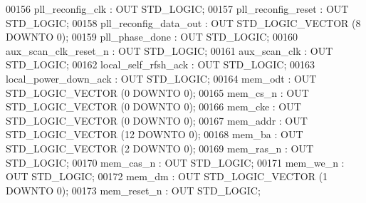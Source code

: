 \begin{DoxyCode}
{00156         pll_reconfig_clk    : \textcolor{keywordflow}{OUT} \textcolor{comment}{STD\_LOGIC};
00157         pll_reconfig_reset  : \textcolor{keywordflow}{OUT} \textcolor{comment}{STD\_LOGIC};
00158         pll_reconfig_data_out   : \textcolor{keywordflow}{OUT} \textcolor{comment}{STD\_LOGIC\_VECTOR} (\textcolor{vhdllogic}{}\textcolor{vhdllogic}{8} \textcolor{keywordflow}{DOWNTO} \textcolor{vhdllogic}{}\textcolor{vhdllogic}{0});
00159         pll_phase_done  : \textcolor{keywordflow}{OUT} \textcolor{comment}{STD\_LOGIC};
00160         aux_scan_clk_reset_n    : \textcolor{keywordflow}{OUT} \textcolor{comment}{STD\_LOGIC};
00161         aux_scan_clk    : \textcolor{keywordflow}{OUT} \textcolor{comment}{STD\_LOGIC};
00162         local_self_rfsh_ack : \textcolor{keywordflow}{OUT} \textcolor{comment}{STD\_LOGIC};
00163         local_power_down_ack    : \textcolor{keywordflow}{OUT} \textcolor{comment}{STD\_LOGIC};
00164         mem_odt : \textcolor{keywordflow}{OUT} \textcolor{comment}{STD\_LOGIC\_VECTOR} (\textcolor{vhdllogic}{}\textcolor{vhdllogic}{0} \textcolor{keywordflow}{DOWNTO} \textcolor{vhdllogic}{}\textcolor{vhdllogic}{0});
00165         mem_cs_n    : \textcolor{keywordflow}{OUT} \textcolor{comment}{STD\_LOGIC\_VECTOR} (\textcolor{vhdllogic}{}\textcolor{vhdllogic}{0} \textcolor{keywordflow}{DOWNTO} \textcolor{vhdllogic}{}\textcolor{vhdllogic}{0});
00166         mem_cke : \textcolor{keywordflow}{OUT} \textcolor{comment}{STD\_LOGIC\_VECTOR} (\textcolor{vhdllogic}{}\textcolor{vhdllogic}{0} \textcolor{keywordflow}{DOWNTO} \textcolor{vhdllogic}{}\textcolor{vhdllogic}{0});
00167         mem_addr    : \textcolor{keywordflow}{OUT} \textcolor{comment}{STD\_LOGIC\_VECTOR} (\textcolor{vhdllogic}{}\textcolor{vhdllogic}{12} \textcolor{keywordflow}{DOWNTO} \textcolor{vhdllogic}{}\textcolor{vhdllogic}{0});
00168         mem_ba  : \textcolor{keywordflow}{OUT} \textcolor{comment}{STD\_LOGIC\_VECTOR} (\textcolor{vhdllogic}{}\textcolor{vhdllogic}{2} \textcolor{keywordflow}{DOWNTO} \textcolor{vhdllogic}{}\textcolor{vhdllogic}{0});
00169         mem_ras_n   : \textcolor{keywordflow}{OUT} \textcolor{comment}{STD\_LOGIC};
00170         mem_cas_n   : \textcolor{keywordflow}{OUT} \textcolor{comment}{STD\_LOGIC};
00171         mem_we_n    : \textcolor{keywordflow}{OUT} \textcolor{comment}{STD\_LOGIC};
00172         mem_dm  : \textcolor{keywordflow}{OUT} \textcolor{comment}{STD\_LOGIC\_VECTOR} (\textcolor{vhdllogic}{}\textcolor{vhdllogic}{1} \textcolor{keywordflow}{DOWNTO} \textcolor{vhdllogic}{}\textcolor{vhdllogic}{0});
00173         mem_reset_n : \textcolor{keywordflow}{OUT} \textcolor{comment}{STD\_LOGIC};
}
\end{DoxyCode}
